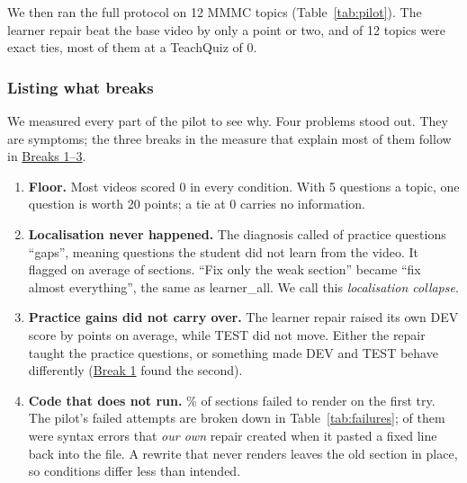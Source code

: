 \documentclass[11pt]{article}
\begin{document}
We then ran the full protocol on 12 MMMC topics (Table~\ref{tab:pilot}). The learner repair beat the base video by only a
point or two, and \PilotTies{} of 12 topics were exact ties, most of them at a TeachQuiz of 0.



\subsubsection*{Listing what breaks}\label{sec:breaks}

We measured every part of the pilot to see why. Four problems stood out. They are symptoms; the three breaks in the measure that explain most of them follow in \hyperref[sec:idbug]{Breaks 1--3}.
\begin{enumerate}
  \item \textbf{Floor.} Most videos scored 0 in every condition. With 5 questions a topic, one question is worth 20
  points; a tie at 0 carries no information.
  \item \textbf{Localisation never happened.} The diagnosis called \PilotGaps{} of \PilotDev{} practice questions
  ``gaps'', meaning questions the student did not learn from the video. It flagged on average \PilotFlagged{} of \PilotSections{} sections. ``Fix only the weak section'' became
  ``fix almost everything'', the same as learner\_all. We call this \emph{localisation collapse}.
  \item \textbf{Practice gains did not carry over.} The learner repair raised its own DEV score by \PilotDevGain{}
  points on average, while TEST did not move. Either the repair taught the practice questions, or something made DEV
  and TEST behave differently (\hyperref[sec:idbug]{Break 1} found the second).
  \item \textbf{Code that does not run.} \FirstTryFail\% of sections failed to render on the first try. The
  pilot's \FailedAttempts{} failed attempts are broken down in Table~\ref{tab:failures}; \SyntaxAfterPatch{} of them
  were syntax errors that \emph{our own} repair created when it pasted a fixed line back into the file.
  A rewrite that never renders leaves the old section in place, so conditions differ less than intended.
\end{enumerate}
\end{document}
